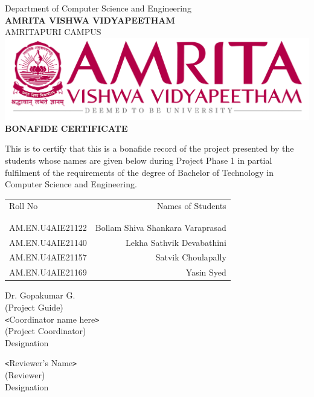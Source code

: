 \documentclass[a4paper, 12pt]{report}
\theoremstyle{definition}
\begin{document}
	\newpage
	\begin{center}
		
		{\large Department of Computer Science and Engineering}\\
		\Large{ \textbf{AMRITA VISHWA VIDYAPEETHAM}}\\
			{\large AMRITAPURI CAMPUS}\\
		\vspace*{2.2cm}
		\includegraphics[scale=0.5]{univa.png}\\
		\vspace*{1.5cm}
		{\Large \textbf{BONAFIDE CERTIFICATE}}
	\end{center}
	\vspace*{.8cm}
	This is to certify that this is a bonafide record of the project presented by the students whose names are given below during Project Phase 1 in partial fulfilment of the requirements of the degree of Bachelor of Technology in Computer Science and Engineering.\\[1.0cm]

\begin{table}[h]
\centering
\begin{tabular}{lr}
Roll No & Names of Students \\ \\ \hline
\\
AM.EN.U4AIE21122 & Bollam Shiva Shankara Varaprasad \\
AM.EN.U4AIE21140 & Lekha Sathvik Devabathini \\
AM.EN.U4AIE21157 & Satvik Choulapally \\ 
AM.EN.U4AIE21169 & Yasin Syed \\  
\end{tabular}
\end{table}



\begin{flushleft}
  Dr. Gopakumar G.\\
(Project Guide)\\  [1cm]

 \texttt{<}Coordinator name here\texttt{>}\\
(Project Coordinator)\\
Designation\\
\end{flushleft}
\begin{flushright}
\texttt{<}Reviewer's Name\texttt{>}\\
(Reviewer)\\
Designation
\end{flushright}
\end{document}

